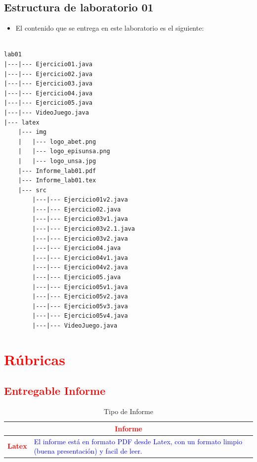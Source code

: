 \documentclass{article}
\begin{document}
    \newpage
	\subsection{Estructura de laboratorio 01}
	\begin{itemize}	
		\item El contenido que se entrega en este laboratorio es el siguiente:
	\end{itemize}
	
\begin{lstlisting}[style=ascii-tree]

lab01
|---|--- Ejercicio01.java
|---|--- Ejercicio02.java
|---|--- Ejercicio03.java
|---|--- Ejercicio04.java
|---|--- Ejercicio05.java
|---|--- VideoJuego.java
|--- latex
    |--- img
    |   |--- logo_abet.png
    |   |--- logo_episunsa.png
    |   |--- logo_unsa.jpg
    |--- Informe_lab01.pdf
    |--- Informe_lab01.tex
    |--- src
        |---|--- Ejercicio01v2.java
        |---|--- Ejercicio02.java
        |---|--- Ejercicio03v1.java
        |---|--- Ejercicio03v2.1.java
        |---|--- Ejercicio03v2.java
        |---|--- Ejercicio04.java
        |---|--- Ejercicio04v1.java
        |---|--- Ejercicio04v2.java
        |---|--- Ejercicio05.java
        |---|--- Ejercicio05v1.java
        |---|--- Ejercicio05v2.java
        |---|--- Ejercicio05v3.java
        |---|--- Ejercicio05v4.java
        |---|--- VideoJuego.java

\end{lstlisting}    

	\section{\textcolor{red}{Rúbricas}}
	
	\subsection{\textcolor{red}{Entregable Informe}}
	\begin{table}[H]
		\caption{Tipo de Informe}
		\setlength{\tabcolsep}{0.5em} %
		{\renewcommand{\arraystretch}{1.5}%
		\begin{tabular}{|p{3cm}|p{12cm}|}
			\hline
			\multicolumn{2}{|c|}{\textbf{\textcolor{red}{Informe}}}  \\
			\hline 
			\textbf{\textcolor{red}{Latex}} & \textcolor{blue}{El informe está en formato PDF desde Latex,  con un formato limpio (buena presentación) y facil de leer.}   \\ 
			\hline 
			
			
		\end{tabular}
	}
	\end{table}
	
\end{document}
